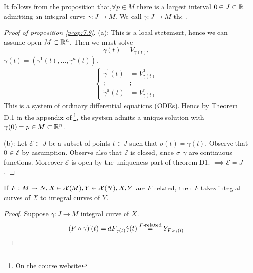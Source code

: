 \begin{remark}
    It follows from the proposition that,\(\forall p\in M\) there is a largest interval \(0\in J\subset\mathbb{R}\) admitting an integral curve \(\gamma:J\to M\).
    We call \(\gamma : J\to M\) the .
\end{remark}

\begin{proof}[Proof of proposition \ref{prop:7.9}]
    (a): This is a local statement, hence we can assume open \(M\subset\mathbb{R}^n\). Then we must solve 
    \[\dot{\gamma}(t)=V_{\gamma(t)},\]
    \(\gamma(t)=(\gamma^1(t),\dots,\gamma^n(t))\).
    \begin{align*}
        \begin{cases}
            \dot{\gamma}^1(t)&=V^1_{\gamma(t)}\\
            \vdots & \vdots \\
            \dot{\gamma}^n(t)&=V^n_{\gamma(t)}
        \end{cases}
    \end{align*}
    This is a system of ordinary differential equations (ODEs). Hence by Theorem D.1 in the appendix of \cite{smooth_manifolds}\footnote{On the course website}, 
    the system admits a unique solution with \(\gamma(0)=p\in M \subset \mathbb{R}^n\). 

    (b): Let \(\mathcal{E}\subset J\) be a subset of points \(t\in J\) such that \(\sigma(t)=\gamma(t)\).
    Observe that \(0\in\mathcal{E}\) by assumption. Observe also that \(\mathcal{E}\) is closed, since \(\sigma,\gamma\) are continuous functions.
    Moreover \(\mathcal{E}\) is open by the uniqueness part of theorem D1. \(\implies \mathcal{E}=J\).\qedhere

\end{proof}

\begin{lemma}\label{lem:7.10}
    If \(F:M\to N,X\in \mathcal{X}(M),Y\in \mathcal{X}(N),X,Y\) are \(F\) related, then \(F\) takes 
    integral curves of \(X\) to integral curves of \(Y\).
\end{lemma}

\begin{proof}
    Suppose \(\gamma:J\to M\) integral curve of \(X\). 
    \begin{align*}
        (F\circ \gamma)'(t)=dF_{\gamma(t)}\dot\gamma(t)\stackrel{F\text{-related}}{=}Y_{F\circ \gamma(t)}\qedhere
    \end{align*}
\end{proof}

